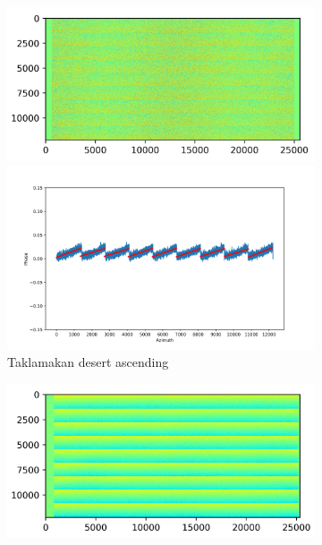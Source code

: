 \documentclass[a4paper,fleqn]{cas-sc}
\begin{document}
\begin{figure}
    \centering
    \begin{subfigure}[c]{0.5\textwidth}
        \centering
        \begin{minipage}[c]{0.5\textwidth}
            \centering
            \includegraphics[width=\textwidth]{figure/The cross-interferogram/cross_interf_TaklimakanDesert_asc.png}
        \end{minipage}%
        \begin{minipage}[c]{0.5\textwidth}
            \centering
            \includegraphics[width=\textwidth]{figure/The cross-interferogram/cross_interf_TaklimakanDesert_asc_row&fitted_20230102.png}
        \end{minipage}
        \caption{Taklamakan desert ascending}
        \label{fig_5a}
    \end{subfigure}%
    \begin{subfigure}[c]{0.5\textwidth}
        \centering
        \begin{minipage}[c]{0.5\textwidth}
            \centering
            \includegraphics[width=\textwidth]{figure/The cross-interferogram/cross_interf_TaklimakanDesert_des.png}

\end{minipage}
\end{subfigure}
\end{figure}
\end{document}
